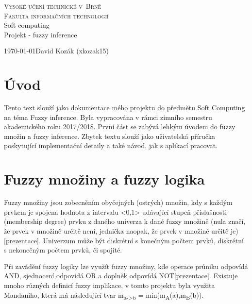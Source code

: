 \documentclass[12pt,a4paper,titlepage]{article}
\begin{document}
\begin{titlepage}
\begin{center}
    {
    	\Huge\textsc{Vysoké učení technické v~Brně}}\\
    \smallskip
    {
    	\huge\textsc{Fakulta informačních technologií}}\\
    \bigskip
    \huge{Soft computing}\\
    \smallskip
    \Huge{Projekt - fuzzy inference}\\
\end{center}
    {\Large \today \hfill David Kozák (xkozak15)  }\\
\end{titlepage}

\newpage
\tableofcontents
\newpage

\section{Úvod}
Tento text slouží jako dokumentace mého projektu do předmětu Soft Computing na téma Fuzzy inference. Byla vypracována v rámci zimního semestru akademického roku 2017/2018. První část se zabývá lehkým úvodem do fuzzy množin a fuzzy inference. Zbytek textu slouží jako uživatelská příručka poskytující implementační detaily a také návod, jak s aplikací pracovat.

\section{Fuzzy množiny a fuzzy logika}
Fuzzy množiny jsou zobecněním obyčejných (ostrých) množin, kdy s každým prvkem je spojena hodnota z intervalu <0,1> udávající stupeň příslušnosti (membership degree) prvku z daného univerza
k dané fuzzy množině (nula značí, že prvek v množině určitě není, jednička naopak, že prvek v množině určitě je)\ref{prezentace}. Univerzum může být diskrétní s konečným počtem prvků, diskrétní s nekonečným počtem prvků, či spojité.

Při zavádění fuzzy logiky lze využít fuzzy množiny, kde operace průniku odpovídá AND, sjednocení odpovídá OR a doplněk odpovídá NOT\ref{prezentace}. Existuje mnoho různých definicí fuzzy implikace, v tomto projektu byla využita Mandaniho, která má následující tvar m\textsubscript{a->b} = min(m\textsubscript{A}(a),m\textsubscript{B}(b)).
\end{document}
